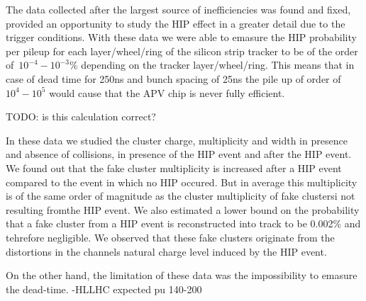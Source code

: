 The data collected after the largest source of inefficiencies was found and fixed, provided an opportunity to study the HIP effect in a greater detail due to the trigger conditions. With these data we were able to emasure the HIP probability per pileup for each layer/wheel/ring of the silicon strip tracker to be of the order of~$10^{-4}-10^{-3}$\% depending on the tracker layer/wheel/ring. This means that in case of dead time for 250ns and bunch spacing of 25ns the pile up of order of $10^4-10^5$  would cause that the APV chip is never fully efficient.

TODO: is this calculation correct?

In these data we studied the cluster charge, multiplicity and width in presence and absence of collisions, in presence of the HIP event and after the HIP event. We found out that the fake cluster multiplicity 
is increased after a HIP event compared to the event in which no HIP occured. But in average this multiplicity is of the same order of magnitude as the cluster multiplicity of fake clustersi not resulting fromthe HIP event. We also estimated a lower bound on the probability that a fake cluster from a HIP event is reconstructed into track to be 0.002\% and tehrefore negligible. We observed that these fake clusters originate from the distortions in the channels natural charge level induced by the HIP event. 

On the other hand, the limitation of these data was the impossibility to emasure the dead-time.
	-HLLHC expected pu 140-200
 
